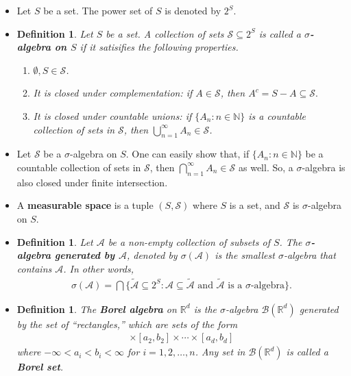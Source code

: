 \documentclass[10pt]{article}
\newtheorem{definition}[lemma]{Definition}
\newcommand{\mcal}[1]{\mathcal{#1}}
\newcommand{\Real}{\mathbb{R}}
\begin{document}
\begin{itemize}
  \item Let $S$ be a set. The power set of $S$ is denoted by $2^S$.
  
  \item \begin{definition}
    Let $S$ be a set. A collection of sets $\mcal{S} \subseteq 2^S$ is called a {\bf $\sigma$-algebra on $S$} if it satisifies the following properties.
    \begin{enumerate}
      \item $\emptyset, S \in \mcal{S}$.
      \item It is closed under complementation: if $A \in \mcal{S}$, then $A^c = S-A \subseteq \mcal{S}.$
      \item It is closed under countable unions: if $\{A_n : n \in \mathbb{N} \}$ is a countable collection of sets in $\mcal{S}$, then $\bigcup_{n=1}^\infty A_n \in \mcal{S}$.
    \end{enumerate}    
  \end{definition}

  \item Let $\mcal{S}$ be a $\sigma$-algebra on $S$. One can easily show that, if $\{A_n : n \in \mathbb{N} \}$ be a countable collection of sets in $\mcal{S}$, then $\bigcap_{n=1}^\infty A_n \in \mcal{S}$ as well. So, a $\sigma$-algebra is also closed under finite intersection.

  \item A {\bf measurable space} is a tuple $(S,\mcal{S})$ where $S$ is a set, and $\mcal{S}$ is $\sigma$-algebra on $S$.  

  \item \begin{definition}
    Let $\mcal{A}$ be a non-empty collection of subsets of $S$. The {\bf $\sigma$-algebra generated by $\mcal{A}$}, denoted by $\sigma(\mcal{A})$ is the smallest $\sigma$-algebra that contains $\mcal{A}$. In other words,
    \begin{align*}
      \sigma(\mcal{A}) = \bigcap\Big\{\tilde{\mcal{A}} \subseteq 2^S : \mcal{A} \subseteq \tilde{\mcal{A}} \mbox{ and $\tilde{\mcal{A}}$ is a $\sigma$-algebra}\Big\}.
    \end{align*}
  \end{definition}
  
  \item \begin{definition} The {\bf Borel algebra} on $\Real^d$ is the $\sigma$-algebra $\mcal{B}(\Real^d)$ generated by the set of ``rectangles,'' which are sets of the form
  \begin{align*}
    [a_1, b_1] \times [a_2, b_2] \times \dotsb \times [a_d, b_d]
  \end{align*}
  where $-\infty < a_i < b_i < \infty$ for $i = 1, 2, \dotsc, n$.
  Any set in $\mcal{B}(\Real^d)$ is called a {\bf Borel set}.  
  \end{definition}


\end{itemize}
\end{document}
